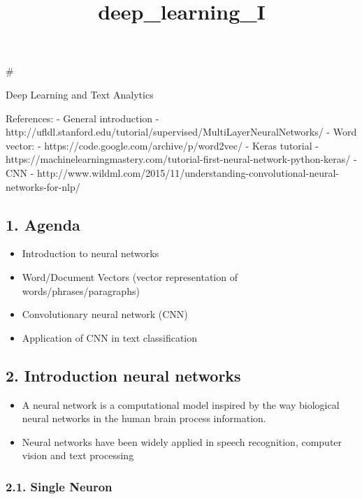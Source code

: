 \documentclass[11pt]{article}
\title{deep\_learning\_I}
\providecommand{\tightlist}{%
      \setlength{\itemsep}{0pt}\setlength{\parskip}{0pt}}
\begin{document}
    
    
    \maketitle
    
    

    
    \#

Deep Learning and Text Analytics

References: - General introduction -
http://ufldl.stanford.edu/tutorial/supervised/MultiLayerNeuralNetworks/
- Word vector: - https://code.google.com/archive/p/word2vec/ - Keras
tutorial -
https://machinelearningmastery.com/tutorial-first-neural-network-python-keras/
- CNN -
http://www.wildml.com/2015/11/understanding-convolutional-neural-networks-for-nlp/

    \hypertarget{agenda}{%
\subsection{1. Agenda}\label{agenda}}

\begin{itemize}
\tightlist
\item
  Introduction to neural networks
\item
  Word/Document Vectors (vector representation of
  words/phrases/paragraphs)
\item
  Convolutionary neural network (CNN)
\item
  Application of CNN in text classification
\end{itemize}

    \hypertarget{introduction-neural-networks}{%
\subsection{2. Introduction neural
networks}\label{introduction-neural-networks}}

\begin{itemize}
\tightlist
\item
  A neural network is a computational model inspired by the way
  biological neural networks in the human brain process information.
\item
  Neural networks have been widely applied in speech recognition,
  computer vision and text processing
\end{itemize}

    \hypertarget{single-neuron}{%
\subsubsection{2.1. Single Neuron}\label{single-neuron}}
\end{document}
